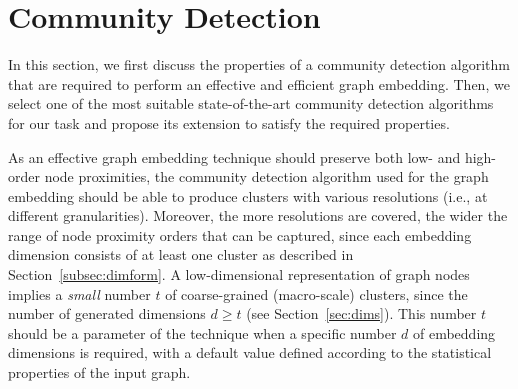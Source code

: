 \documentclass[conference]{IEEEtran}
\begin{document}
\section{Community Detection}
\label{sec:calg}

In this section, we first discuss the properties of a community detection algorithm that are required to perform an effective and efficient graph embedding. Then, we select one of the most suitable state-of-the-art community detection algorithms for our task and propose its extension to satisfy the required properties.


As an effective graph embedding technique should preserve both low- and high-order node proximities, the community detection algorithm used for the graph embedding should be able to produce clusters with various resolutions (i.e., at different granularities). Moreover, the more resolutions are covered, the wider the range of node proximity orders that can be captured, since each embedding dimension consists of at least one cluster as described in Section~\ref{subsec:dimform}.
A low-dimensional representation of graph nodes implies a \emph{small} number $t$ of coarse-grained (macro-scale) clusters, since the number of generated dimensions $d \ge t$ (see Section~\ref{sec:dims}). This number $t$ should be a parameter of the technique when a specific number $d$ of embedding dimensions is required, with a default value defined according to the statistical properties of the input graph.
\end{document}
